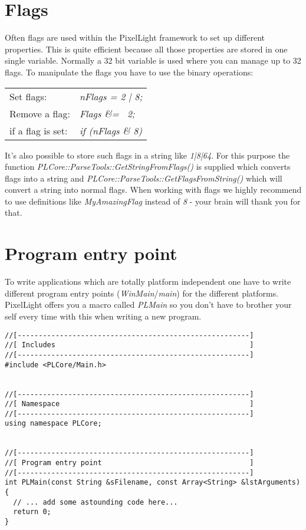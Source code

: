 \section{Flags}
Often flags are used within the PixelLight framework to set up different properties. This is quite efficient because all those properties are stored in one single variable. Normally a 32 bit variable is used where you can manage up to 32 flags. To manipulate the flags you have to use the binary operations:
\begin{tabular}{ll}
Set flags:&
  \emph{nFlags = 2 | 8;}\\
Remove a flag:&
  \emph{Flags \&= ~2;}\\
if a flag is set:&
  \emph{if (nFlags \& 8)}\\
\end{tabular}
It's also possible to store such flags in a string like \emph{1|8|64}. For this purpose the function \emph{PLCore::ParseTools::GetStringFromFlags()} is supplied which converts flags into a string and \emph{PLCore::ParseTools::GetFlagsFromString()} which will convert a string into normal flags. When working with flags we highly recommend to use definitions like \emph{MyAmazingFlag} instead of \emph{8} - your brain will thank you for that.




\section{Program entry point}
To write applications which are totally platform independent one have to write different program entry points (\emph{WinMain}/\emph{main}) for the different platforms. PixelLight offers you a macro called \emph{PLMain} so you don't have to brother your self every time with this when writing a new program.

\begin{lstlisting}[caption=Program entry point example]
//[-------------------------------------------------------]
//[ Includes                                              ]
//[-------------------------------------------------------]
#include <PLCore/Main.h>


//[-------------------------------------------------------]
//[ Namespace                                             ]
//[-------------------------------------------------------]
using namespace PLCore;


//[-------------------------------------------------------]
//[ Program entry point                                   ]
//[-------------------------------------------------------]
int PLMain(const String &sFilename, const Array<String> &lstArguments)
{
  // ... add some astounding code here...
  return 0;
}
\end{lstlisting}

